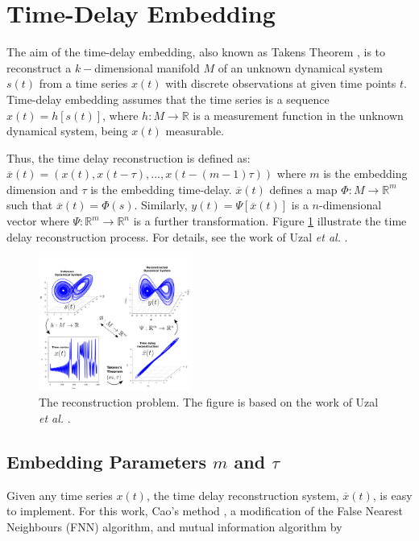 \documentclass[10pt,journal,compsoc]{IEEEtran}
\begin{document}
\section{Time-Delay Embedding}
The aim of the time-delay embedding, also known as Takens Theorem \cite{Takens1981}, 
is to reconstruct a $k-$dimensional manifold $M$ of an unknown dynamical system $s(t)$ 
from a time series $x(t)$ with discrete observations at given time points $t$. 
Time-delay embedding assumes that the time series 
is a sequence $x(t)=h[s(t)]$,  where  $h: M \rightarrow \mathbb{R}$ 
is a measurement function in the unknown dynamical system, being $x(t)$ measurable.

Thus, the time delay reconstruction is defined as:
$\overline{x}(t) = (x(t), x(t-\tau),...,x(t-(m-1)\tau))$ 
where $m$ is the embedding dimension and $\tau$ is the embedding time-delay.
$\overline{x}(t)$ defines a map $\varPhi: M \rightarrow \mathbb{R}^m$ such that 
$\overline{x}(t) = \varPhi(s)$.
Similarly, $y(t)= \varPsi [\overline{x}(t)]$ is a $n$-dimensional vector 
where $\varPsi: \mathbb{R}^m \rightarrow \mathbb{R}^n$ is a further transformation.
Figure \ref{fig:takenstheorem} illustrate the time delay reconstruction process.
For details, see the work of Uzal \emph{et al.} \cite{Uzal2011}.

\begin{figure}[!htb]
\centering    
\includegraphics[width=0.45\textwidth]{takenstheorem}
\caption[PA]{The reconstruction problem. The figure is based on the work of Uzal 
\emph{et al.} \cite{Uzal2011}.}
\label{fig:takenstheorem}
\end{figure}

\subsection{Embedding Parameters $m$ and $\tau$}
Given any time series $x(t)$, the time delay reconstruction system, $\overline{x}(t)$,
is easy to implement. For this work, Cao's method \cite{Cao1997}, a modification of the 
False Nearest Neighbours (FNN) algorithm, and mutual information algorithm by 
\end{document}
